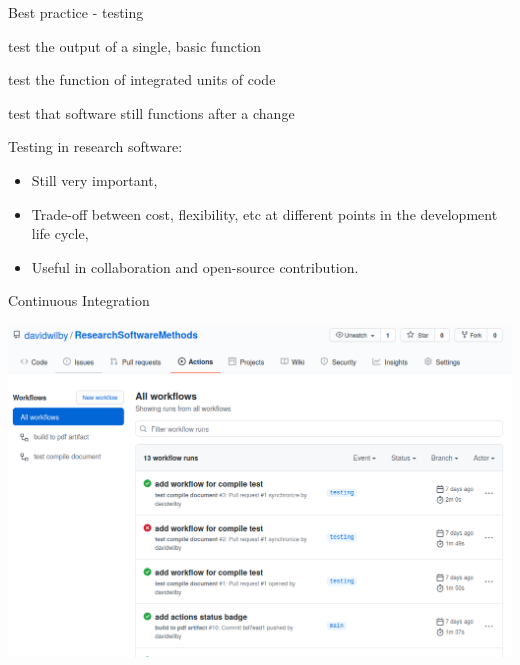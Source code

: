 \documentclass{beamer} %
\begin{document}
  \begin{frame}[fragile]{Best practice - testing}
    \begin{tcolorbox}[skin=beamer,adjusted title=Unit Tests]
      test the output of a single, basic function
    \end{tcolorbox}
    
    \begin{tcolorbox}[skin=beamer,adjusted title=Integration Tests]
      test the function of integrated units of code
    \end{tcolorbox}
    
    \begin{tcolorbox}[skin=beamer,adjusted title=Regression Tests]
      test that software still functions after a change
    \end{tcolorbox}
    
    \tiny
    Testing in research software:
    \begin{itemize}
      \item Still very important,
      \item Trade-off between cost, flexibility, etc at different points in the development life cycle,
      \item Useful in collaboration and open-source contribution.
    \end{itemize}
  \end{frame}

  \begin{frame}[label=CI]{Continuous Integration}
    \begin{center}
      \href{https://github.com/davidwilby/ResearchSoftwareMethods/actions}{
      \includegraphics[height=0.9\textheight]{githubactions_screenshot.png}
      }
    \end{center}
  \end{frame}
\end{document}
